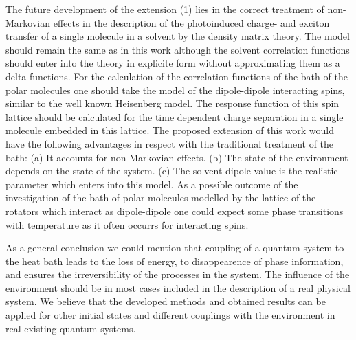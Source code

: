 \documentclass[12pt,twoside,a4paper]{report}
\begin{document}
{The  future development of the extension (1) lies in the 
correct treatment of non-Markovian effects in the description of 
the photoinduced charge- and exciton transfer of 
a single molecule in a solvent
by the density matrix theory.
The model should remain the same as
in this work 
although
the solvent correlation functions should enter into the theory 
in explicite form
without approximating them as a delta functions.
For the calculation of the correlation functions 
of the bath of the polar molecules
one should take the model 
of the dipole-dipole interacting spins, similar to the 
well known Heisenberg model.
The response function of this spin lattice should be calculated
for the time dependent 
charge separation in a single molecule embedded in this lattice.
The proposed extension of this work would have the following advantages
in respect with the traditional treatment of the bath:
(a) It accounts for  non-Markovian effects.
(b) The state of the environment depends on the state of the system.
(c) The solvent dipole value is the realistic parameter which enters into
   this model.
As a possible outcome of the investigation of the
    bath of polar molecules  modelled by the lattice
    of the rotators which interact as dipole-dipole
one could expect
    some phase transitions 
    with temperature
    as it often occurrs for interacting spins.




As a general conclusion we could mention
that coupling of a quantum system to the heat bath 
leads to the loss of energy, 
to disappearence of phase information,
and ensures the irreversibility of the processes in the system.
The influence of the environment should be in most cases included
in the description of a real physical system.
We believe that 
the developed methods and obtained results 
can be applied for other initial states and different
couplings with the environment in real existing quantum systems.



\chapter*{}
\appendix
%
}
\end{document}
